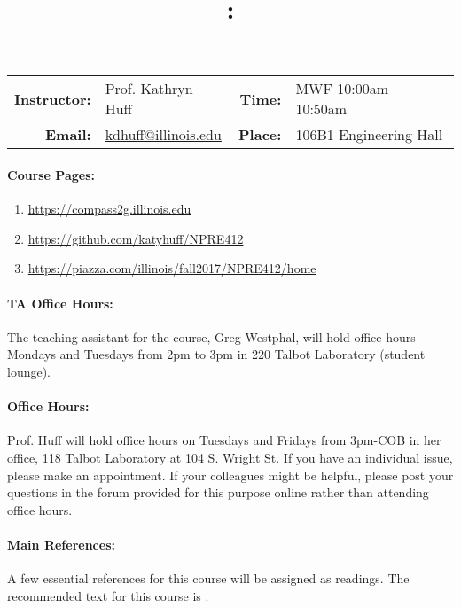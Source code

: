 \documentclass[11pt, a4paper]{article}
\title{\CourseNumber: \CourseTitle\\}
\author{\CourseUniversity}
\date{\CourseSemester \CourseYear}
\makeatletter
\newcommand{\CourseNumber}{NPRE412}
\newcommand{\CourseInstructor}{Prof. Kathryn Huff\xspace}%
\newcommand{\CourseDays}{MWF\xspace}%
\newcommand{\CourseStart}{10:00am\xspace}%
\newcommand{\CourseEnd}{10:50am\xspace}%
\newcommand{\CourseInstructorEmail}{kdhuff@illinois.edu}
\newcommand{\CourseRoom}{106B1\xspace}%
\newcommand{\CourseBuilding}{Engineering Hall\xspace}%
\newcommand{\TeachingAssistant}{Greg Westphal\xspace}%
\newcommand{\TAOfficeHourDays}{Mondays and Tuesdays\xspace}%
\newcommand{\TAOfficeHourStart}{2pm\xspace}%
\newcommand{\TAOfficeHourEnd}{3pm\xspace}%
\newcommand{\TAOfficeHourPlace}{220 Talbot Laboratory (student lounge)\xspace}
\makeatother
\begin{document}
\maketitle
\renewcommand{\arraystretch}{1.5}
\begin{center}
\begin{table}[h]
\begin{tabularx}{\textwidth}{rXrX}
\hline
\textbf{Instructor:} & \CourseInstructor & \textbf{Time:} & \CourseDays \CourseStart -- \CourseEnd \\
\textbf{Email:} &  \href{mailto:\CourseInstructorEmail}{\CourseInstructorEmail} & \textbf{Place:} & \CourseRoom \CourseBuilding\\
\end{tabularx}
\end{table}
\end{center}

\paragraph{Course Pages:}
\begin{enumerate}
        \item \url{https://compass2g.illinois.edu}
        \item \url{https://github.com/katyhuff/\CourseNumber}
        \item \url{https://piazza.com/illinois/fall2017/\CourseNumber/home}
\end{enumerate}

\paragraph{TA Office Hours:} The teaching assistant for the course, 
\TeachingAssistant, will hold office hours \TAOfficeHourDays from 
\TAOfficeHourStart to \TAOfficeHourEnd in \TAOfficeHourPlace.

\paragraph{Office Hours:} Prof. Huff will hold office hours on Tuesdays and 
Fridays from 3pm-COB in her office, 118 Talbot Laboratory at 104 S. Wright St. 
If you have an individual issue, please make an appointment. If your colleagues 
might be helpful, please post your questions in the forum provided for this 
purpose online rather than attending office hours.

\paragraph{Main References:}
A few essential references for this course will be assigned as readings. The 
recommended text for this course is \cite{tsoulfanidis_nuclear_2013}.

\renewcommand{\refname}{\normalfont\selectfont\normalsize}\vspace{-1cm} 

\end{document}
